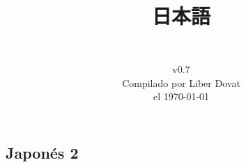 \documentclass[a4paper,12pt,oneside]{report}
\begin{document}
\begin{CJK*}{UTF8}{min}%



  \title{
    \begin{flushright}
      \Huge  日本語\\
      \LARGE {}
    \end{flushright}
  } %

  \author{\vspace{7cm}\\
    v0.7\\
    Compilado por Liber Dovat\\
    el \today\\
  } %

  \date{}
  \maketitle

  \newpage


  \tableofcontents
  \thispagestyle{plain}

  \newpage




%
%
%


  \chapter{Japon\'es 2}
  \thispagestyle{contenido} %
  \pagestyle{contenido}     %


\end{CJK*}
\end{document}
